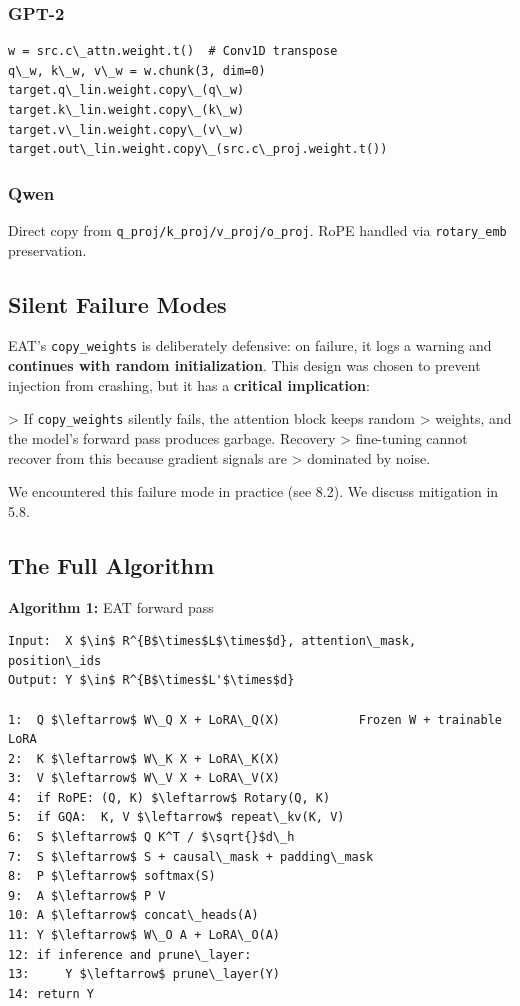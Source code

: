 \subsubsection{GPT-2}

\begin{lstlisting}
w = src.c\_attn.weight.t()  # Conv1D transpose
q\_w, k\_w, v\_w = w.chunk(3, dim=0)
target.q\_lin.weight.copy\_(q\_w)
target.k\_lin.weight.copy\_(k\_w)
target.v\_lin.weight.copy\_(v\_w)
target.out\_lin.weight.copy\_(src.c\_proj.weight.t())
\end{lstlisting}

\subsubsection{Qwen}

Direct copy from \texttt{q\_proj/k\_proj/v\_proj/o\_proj}. RoPE handled via \texttt{rotary\_emb} 
preservation.

\subsection{Silent Failure Modes}

EAT's \texttt{copy\_weights} is deliberately defensive: on failure, it logs a 
warning and \textbf{continues with random initialization}. This design was chosen 
to prevent injection from crashing, but it has a \textbf{critical implication}:

\textgreater{} If \texttt{copy\_weights} silently fails, the attention block keeps random 
\textgreater{} weights, and the model's forward pass produces garbage. Recovery 
\textgreater{} fine-tuning cannot recover from this because gradient signals are 
\textgreater{} dominated by noise.

We encountered this failure mode in practice (see  8.2). We discuss 
mitigation in  5.8.

\subsection{The Full Algorithm}

\textbf{Algorithm 1:} EAT forward pass
\begin{lstlisting}
Input:  X $\in$ R^{B$\times$L$\times$d}, attention\_mask, position\_ids
Output: Y $\in$ R^{B$\times$L'$\times$d}

1:  Q $\leftarrow$ W\_Q X + LoRA\_Q(X)           Frozen W + trainable LoRA
2:  K $\leftarrow$ W\_K X + LoRA\_K(X)
3:  V $\leftarrow$ W\_V X + LoRA\_V(X)
4:  if RoPE: (Q, K) $\leftarrow$ Rotary(Q, K)
5:  if GQA:  K, V $\leftarrow$ repeat\_kv(K, V)
6:  S $\leftarrow$ Q K^T / $\sqrt{}$d\_h
7:  S $\leftarrow$ S + causal\_mask + padding\_mask
8:  P $\leftarrow$ softmax(S)
9:  A $\leftarrow$ P V
10: A $\leftarrow$ concat\_heads(A)
11: Y $\leftarrow$ W\_O A + LoRA\_O(A)
12: if inference and prune\_layer:
13:     Y $\leftarrow$ prune\_layer(Y)
14: return Y
\end{lstlisting}

